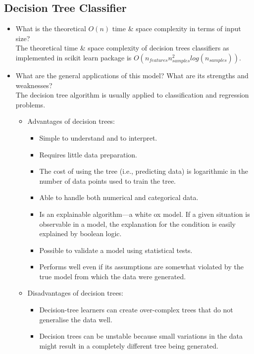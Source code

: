 \documentclass[12pt]{article}
\begin{document}
\subsection*{Decision Tree Classifier}
\begin{itemize} [noitemsep,nolistsep]
\item What is the theoretical $O(n)$ time \& space complexity in terms of input size?\\ 
The theoretical time \& space complexity of decision trees classifiers as implemented in scikit learn package is $O(n_{features} n^2_{samples} log(n_{samples}))$.
\item What are the general applications of this model? What are its strengths and weaknesses?\\ 
The decision tree algorithm is usually applied to classification and regression problems. 
       \begin{itemize}[noitemsep,nolistsep]
       \item Advantages of decision trees:
              \begin{itemize}[noitemsep,nolistsep]
                     \item Simple to understand and to interpret. 
                     \item Requires little data preparation. 
                     \item The cost of using the tree (i.e., predicting data) is logarithmic in the number of data points used to train the tree.
                     \item Able to handle both numerical and categorical data.
                     \item Is an explainable algorithm---a white ox model. If a given situation is observable in a model, the explanation for the condition is easily explained by boolean logic.
                     \item Possible to validate a model using statistical tests. 
                     \item Performs well even if its assumptions are somewhat violated by the true model from which the data were generated.
              \end{itemize}
       \item Disadvantages of decision trees:
              \begin{itemize}[noitemsep,nolistsep]
                     \item Decision-tree learners can create over-complex trees that do not generalise the data well.
                     \item Decision trees can be unstable because small variations in the data might result in a completely different tree being generated. 

\end{itemize}
\end{itemize}
\end{itemize}
\end{document}
